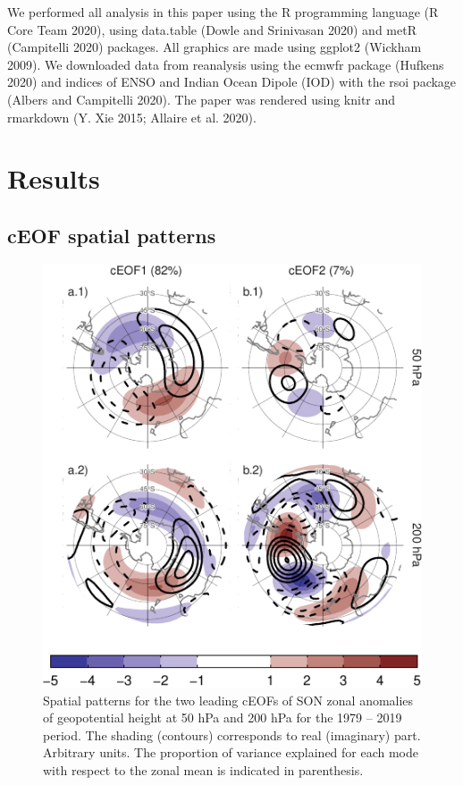 \documentclass[smallextended]{svjour3}       %
\begin{document}
We performed all analysis in this paper using the R programming language (R Core Team 2020), using data.table (Dowle and Srinivasan 2020) and metR (Campitelli 2020) packages.
All graphics are made using ggplot2 (Wickham 2009).
We downloaded data from reanalysis using the ecmwfr package (Hufkens 2020) and indices of ENSO and Indian Ocean Dipole (IOD) with the rsoi package (Albers and Campitelli 2020).
The paper was rendered using knitr and rmarkdown (Y. Xie 2015; Allaire et al. 2020).

\hypertarget{results}{%
\section{Results}\label{results}}

\hypertarget{spatial}{%
\subsection{cEOF spatial patterns}\label{spatial}}

\begin{figure}
\centering
\includegraphics{../figures/ceofs-1-1.pdf}
\caption{\label{fig:ceofs-1}Spatial patterns for the two leading cEOFs of SON zonal anomalies of geopotential height at 50 hPa and 200 hPa for the 1979 -- 2019 period. The shading (contours) corresponds to real (imaginary) part. Arbitrary units. The proportion of variance explained for each mode with respect to the zonal mean is indicated in parenthesis.}
\end{figure}
\end{document}
